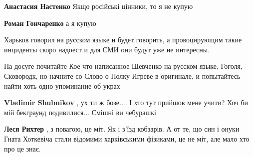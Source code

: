 \begin{itemize}
\begin{itemize}
 
\textbf{Анастасия Настенко} Якщо російські цінники, то я не купую

 
\textbf{Роман Гончаренко} а я купую
\end{itemize}

 

Харьков говорил на русском языке и будет говорить, а провоцирующим такие
инциденты скоро надоест и для СМИ они будут уже не интересны.

На досуге почитайте Кое что написанное Шевченко на русском языке, Гоголя,
Сковородк, но начните со Слово о Полку Игреве в оригинале, и попытайтесь найти
хоть одно упоминание об украх

\begin{itemize}
 
\textbf{Vladimir Shubnikov} , ух ти ж бозе.... І хто тут прийшов мене учити? Хоч би мій бекграунд подивилися... Смішні ви чебурашкі

 
\textbf{Леся Рихтер} , з повагою, це міт. Як і з'їзд кобзарів. А от те, що син
і онуки Гната Хоткевіча стали відомими харківськими фізиками, це не міт, але
мало хто про це знає.


\end{itemize}
\end{itemize}
